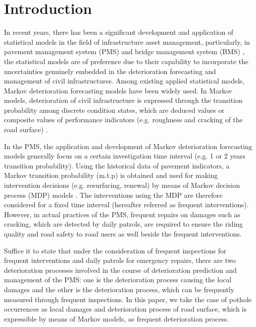 \documentclass[Journal]{ascelike}
\begin{document}
\section{Introduction}\label{introduction}
In recent years, there has been a significant development and application of statistical models in the field of infrastructure asset management, particularly, in pavement management system (PMS) and bridge management system (BMS) \citep{Madanat1995,kobayashitsuda,Kobayashi2010a,Kobayashi2011}, the statistical models are of preference due to their capability to incorporate the uncertainties genuinely embedded in the deterioration forecasting and management  of civil infrastructures. Among existing applied statistical models, Markov deterioration forecasting models have been widely used. In Markov models, deterioration of civil infrastructure is expressed through the transition probability among discrete condition states, which are deduced values or composite values of performance indicators (e.g. roughness and cracking of the road surface) \citep{Kenneth2010}.

In the PMS, the application and development of Markov deterioration forecasting models generally focus on a certain investigation time interval (e.g. 1 or 2 years transition probability). Using the historical data of pavement indicators, a Markov transition probability (m.t.p) is obtained and used for making intervention decisions (e.g. resurfacing, renewal) by means of Markov decision process (MDP) models \citep{Madanat1993,Kobayashi2008b}. The interventions using the MDP are therefore considered for a fixed time interval (hereafter referred as frequent interventions). However, in actual practices of the PMS, frequent repairs on damages such as cracking, which are detected by daily patrols, are required to ensure the riding quality and road safety to road users as well beside the frequent interventions. 

Suffice it to state that under the consideration of frequent inspections for frequent interventions and daily patrols for emergency repairs, there are two deterioration processes involved in the course of deterioration prediction and management of the PMS: one is the deterioration process causing the local damages and the other is the deterioration process, which can be frequently measured through frequent inspections. In this paper, we take the case of pothole occurrences as local damages and deterioration process of road surface, which is expressible by means of Markov models, as frequent deterioration process.
\end{document}
